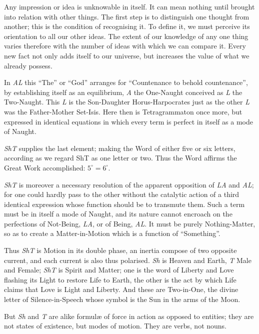 Any impression or idea is unknowable in itself. It can mean nothing until brought into relation with other things. The first step is to distinguish one thought from another; this is the condition of recognising it. To define it, we must perceive its orientation to all our other ideas. The extent of our knowledge of any one thing varies therefore with the number of ideas with which we can compare it. Every new fact not only adds itself to our universe, but increases the value of what we already possess.

In \textit{AL} this \enquote{The} or \enquote{God} arranges for \enquote{Countenance to behold countenance}, by establishing itself as an equilibrium, \textit{A} the One-Naught conceived as \textit{L} the Two-Naught. This \textit{L} is the Son-Daughter Horus-Harpocrates just as the other \textit{L} was the Father-Mother Set-Isis. Here then is Tetragrammaton once more, but expressed in identical equations in which every term is perfect in itself as a mode of Naught.

\textit{ShT} supplies the last element; making the Word of either five or six letters, according as we regard ShT as one letter or two. Thus the Word affirms the Great Work accomplished: $5^{\circ}=6^{\square}$.

\textit{ShT} is moreover a necessary resolution of the apparent opposition of \textit{LA} and \textit{AL}; for one could hardly pass to the other without the catalytic action of a third identical expression whose function should be to transmute them. Such a term must be in itself a mode of Naught, and its nature cannot encroach on the perfections of Not-Being, \textit{LA}, or of Being, \textit{AL}. It must be purely Nothing-Matter, so as to create a Matter-in-Motion which is a function of \enquote{Something}.

Thus \textit{ShT} is Motion in its double phase, an inertia compose of two opposite current, and each current is also thus polarised. \textit{Sh} is Heaven and Earth, \textit{T} Male and Female; \textit{ShT} is Spirit and Matter; one is the word of Liberty and Love flashing its Light to restore Life to Earth, the other is the act by which Life claims that Love is Light and Liberty. And these are Two-in-One, the divine letter of Silence-in-Speech whose symbol is the Sun in the arms of the Moon.

But \textit{Sh} and \textit{T} are alike formul\ae{} of force in action as opposed to entities; they are not states of existence, but modes of motion. They are verbs, not nouns.

